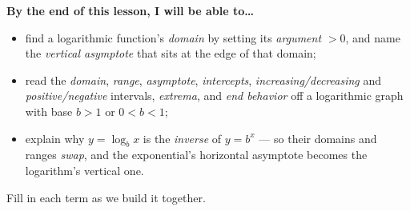 \documentclass[10pt]{article}
\begin{document}
\namedateperiod

\vspace{0.08in}

\begin{objectivebox}
\textbf{By the end of this lesson, I will be able to\dots}
\begin{itemize}\setlength{\itemsep}{2pt}
  \item find a logarithmic function's \emph{domain} by setting its \emph{argument} $>0$, and name the \emph{vertical asymptote} that sits at the edge of that domain;
  \item read the \emph{domain}, \emph{range}, \emph{asymptote}, \emph{intercepts}, \emph{increasing/decreasing} and \emph{positive/negative} intervals, \emph{extrema}, and \emph{end behavior} off a logarithmic graph with base $b>1$ or $0<b<1$;
  \item explain why $y=\log_b x$ is the \emph{inverse} of $y=b^x$ --- so their domains and ranges \emph{swap}, and the exponential's horizontal asymptote becomes the logarithm's vertical one.
\end{itemize}
\end{objectivebox}

\vspace{0.05in}

\begin{vocabbox}
\small
Fill in each term as we build it together.
\par\vspace{2pt}   %
\end{vocabbox}
\end{document}
